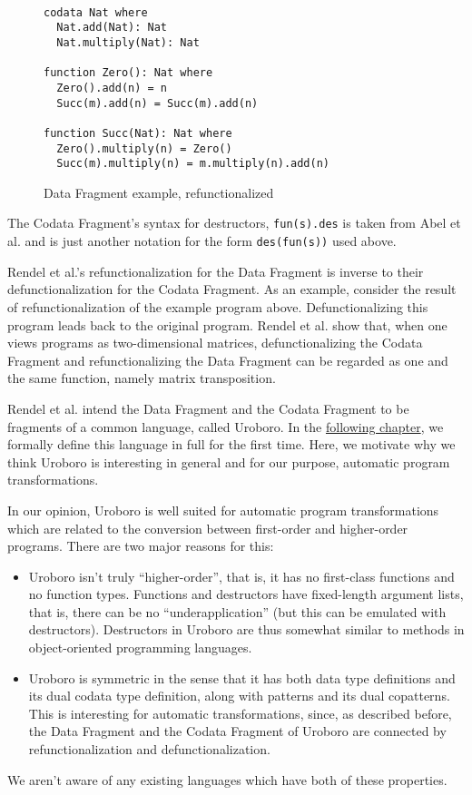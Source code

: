 \begin{figure}
\begin{lstlisting}

codata Nat where
  Nat.add(Nat): Nat
  Nat.multiply(Nat): Nat

function Zero(): Nat where
  Zero().add(n) = n
  Succ(m).add(n) = Succ(m).add(n)

function Succ(Nat): Nat where
  Zero().multiply(n) = Zero()
  Succ(m).multiply(n) = m.multiply(n).add(n)

\end{lstlisting}
\caption{Data Fragment example, refunctionalized}
\label{fig:datafragexrefunced}
\end{figure}

The Codata Fragment's syntax for destructors, \texttt{fun(s).des} is taken from Abel et al.\cite{abel13copatterns} and is just another notation for the form \texttt{des(fun(s))} used above.

Rendel et al.'s\cite{rendel15automatic} refunctionalization for the Data Fragment is inverse to their defunctionalization for the Codata Fragment. As an example, consider the result of refunctionalization of the example program above. Defunctionalizing this program leads back to the original program. Rendel et al. show that, when one views programs as two-dimensional matrices, defunctionalizing the Codata Fragment and refunctionalizing the Data Fragment can be regarded as one and the same function, namely matrix transposition.

Rendel et al. intend the Data Fragment and the Codata Fragment to be fragments of a common language, called Uroboro. In the \hyperref[ch:uro]{following chapter}, we formally define this language in full for the first time. Here, we motivate why we think Uroboro is interesting in general and for our purpose, automatic program transformations.

In our opinion, Uroboro is well suited for automatic program transformations which are related to the conversion between first-order and higher-order programs. There are two major reasons for this:
\begin{itemize}
\item Uroboro isn't truly ``higher-order'', that is, it has no first-class functions and no function types. Functions and destructors have fixed-length argument lists, that is, there can be no ``underapplication'' (but this can be emulated with destructors). Destructors in Uroboro are thus somewhat similar to methods in object-oriented programming languages.

\item Uroboro is symmetric in the sense that it has both data type definitions and its dual codata type definition, along with patterns and its dual copatterns. This is interesting for automatic transformations, since, as described before, the Data Fragment and the Codata Fragment of Uroboro are connected by refunctionalization and defunctionalization.
\end{itemize}
We aren't aware of any existing languages which have both of these properties.

